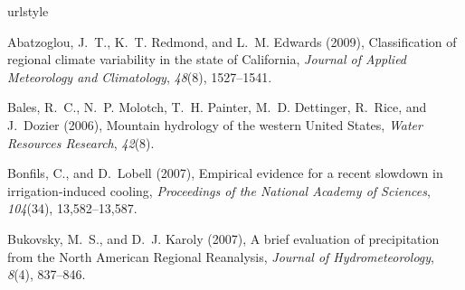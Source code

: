 \documentclass[ms]{agutex}   %
\begin{document}
\begin{article}

%
% 
 







\begin{thebibliography}{84}
\providecommand{\natexlab}[1]{#1}
\expandafter\ifx\csname urlstyle\endcsname\relax
  \providecommand{\doi}[1]{doi:\discretionary{}{}{}#1}\else
  \providecommand{\doi}{doi:\discretionary{}{}{}\begingroup
  \urlstyle{rm}\Url}\fi

Abatzoglou, J.~T., K.~T. Redmond, and L.~M. Edwards (2009), {Classification of
  regional climate variability in the state of California}, \textit{Journal of
  Applied Meteorology and Climatology}, \textit{48}(8), 1527--1541.

Bales, R.~C., N.~P. Molotch, T.~H. Painter, M.~D. Dettinger, R.~Rice, and
  J.~Dozier (2006), {Mountain hydrology of the western United States},
  \textit{Water Resources Research}, \textit{42}(8).

Bonfils, C., and D.~Lobell (2007), Empirical evidence for a recent slowdown in
  irrigation-induced cooling, \textit{Proceedings of the National Academy of
  Sciences}, \textit{104}(34), 13,582--13,587.

Bukovsky, M.~S., and D.~J. Karoly (2007), {A brief evaluation of precipitation
  from the North American Regional Reanalysis}, \textit{Journal of
  Hydrometeorology}, \textit{8}(4), 837--846.


\end{thebibliography}
\end{article}
\end{document}

